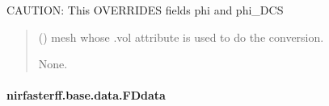 \documentclass[letterpaper,10pt,english]{sphinxmanual}
\begin{document}
\begin{fulllineitems}
\begin{fulllineitems}
\sphinxAtStartPar
CAUTION: This OVERRIDES fields phi and phi\_DCS
\begin{quote}\begin{description}
\sphinxAtStartPar
{} () \textendash{} mesh whose .vol attribute is used to do the conversion.

\sphinxAtStartPar
None.

\end{description}\end{quote}

\end{fulllineitems}


\end{fulllineitems}


\sphinxstepscope


\paragraph{nirfasterff.base.data.FDdata}
\label{\detokenize{_autosummary/nirfasterff.base.data.FDdata:nirfasterff-base-data-fddata}}\label{\detokenize{_autosummary/nirfasterff.base.data.FDdata::doc}}
\end{document}
